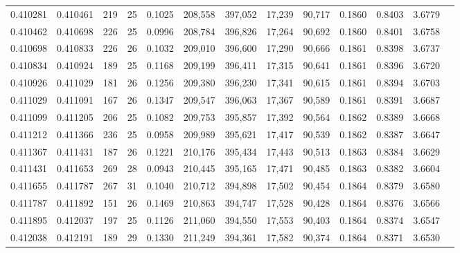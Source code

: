 \begin{tabular}{rrrrrrrrrrrrr}
0.410281 & 0.410461 & 219 &  25 &                                     0.1025 & 208,558 & 397,052 &  17,239 &  90,717 & 0.1860 & 0.8403 & 3.6779 \\
0.410462 & 0.410698 & 226 &  25 &                                     0.0996 & 208,784 & 396,826 &  17,264 &  90,692 & 0.1860 & 0.8401 & 3.6758 \\
0.410698 & 0.410833 & 226 &  26 &                                     0.1032 & 209,010 & 396,600 &  17,290 &  90,666 & 0.1861 & 0.8398 & 3.6737 \\
0.410834 & 0.410924 & 189 &  25 &                                     0.1168 & 209,199 & 396,411 &  17,315 &  90,641 & 0.1861 & 0.8396 & 3.6720 \\
0.410926 & 0.411029 & 181 &  26 &                                     0.1256 & 209,380 & 396,230 &  17,341 &  90,615 & 0.1861 & 0.8394 & 3.6703 \\
0.411029 & 0.411091 & 167 &  26 &                                     0.1347 & 209,547 & 396,063 &  17,367 &  90,589 & 0.1861 & 0.8391 & 3.6687 \\
0.411099 & 0.411205 & 206 &  25 &                                     0.1082 & 209,753 & 395,857 &  17,392 &  90,564 & 0.1862 & 0.8389 & 3.6668 \\
0.411212 & 0.411366 & 236 &  25 &                                     0.0958 & 209,989 & 395,621 &  17,417 &  90,539 & 0.1862 & 0.8387 & 3.6647 \\
0.411367 & 0.411431 & 187 &  26 &                                     0.1221 & 210,176 & 395,434 &  17,443 &  90,513 & 0.1863 & 0.8384 & 3.6629 \\
0.411431 & 0.411653 & 269 &  28 &                                     0.0943 & 210,445 & 395,165 &  17,471 &  90,485 & 0.1863 & 0.8382 & 3.6604 \\
0.411655 & 0.411787 & 267 &  31 &                                     0.1040 & 210,712 & 394,898 &  17,502 &  90,454 & 0.1864 & 0.8379 & 3.6580 \\
0.411787 & 0.411892 & 151 &  26 &                                     0.1469 & 210,863 & 394,747 &  17,528 &  90,428 & 0.1864 & 0.8376 & 3.6566 \\
0.411895 & 0.412037 & 197 &  25 &                                     0.1126 & 211,060 & 394,550 &  17,553 &  90,403 & 0.1864 & 0.8374 & 3.6547 \\
0.412038 & 0.412191 & 189 &  29 &                                     0.1330 & 211,249 & 394,361 &  17,582 &  90,374 & 0.1864 & 0.8371 & 3.6530 \\

\end{tabular}
